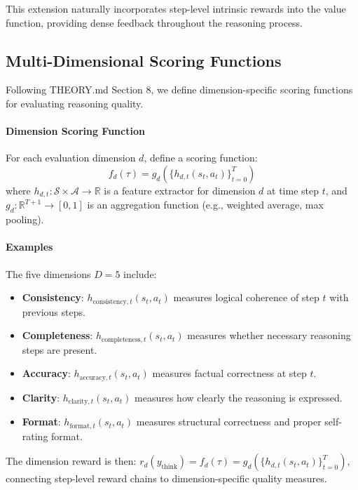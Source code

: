 \documentclass{article}
\theoremstyle{plain}
\theoremstyle{definition}
\theoremstyle{remark}
\begin{document}
This extension naturally incorporates step-level intrinsic rewards into the value function, providing dense feedback throughout the reasoning process.

\subsection{Multi-Dimensional Scoring Functions}

Following THEORY.md Section 8, we define dimension-specific scoring functions for evaluating reasoning quality.

\paragraph{Dimension Scoring Function} For each evaluation dimension $d$, define a scoring function:
\begin{equation}
f_d(\tau) = g_d\left(\{h_{d,t}(s_t, a_t)\}_{t=0}^{T}\right)
\end{equation}
where $h_{d,t}: \mathcal{S} \times \mathcal{A} \to \mathbb{R}$ is a feature extractor for dimension $d$ at time step $t$, and $g_d: \mathbb{R}^{T+1} \to [0,1]$ is an aggregation function (e.g., weighted average, max pooling).

\paragraph{Examples} The five dimensions $D=5$ include:
\begin{itemize}
\item \textbf{Consistency}: $h_{\text{consistency},t}(s_t, a_t)$ measures logical coherence of step $t$ with previous steps.
\item \textbf{Completeness}: $h_{\text{completeness},t}(s_t, a_t)$ measures whether necessary reasoning steps are present.
\item \textbf{Accuracy}: $h_{\text{accuracy},t}(s_t, a_t)$ measures factual correctness at step $t$.
\item \textbf{Clarity}: $h_{\text{clarity},t}(s_t, a_t)$ measures how clearly the reasoning is expressed.
\item \textbf{Format}: $h_{\text{format},t}(s_t, a_t)$ measures structural correctness and proper self-rating format.
\end{itemize}

The dimension reward is then: $r_d(y_{\text{think}}) = f_d(\tau) = g_d(\{h_{d,t}(s_t, a_t)\}_{t=0}^{T})$, connecting step-level reward chains to dimension-specific quality measures.
\end{document}
